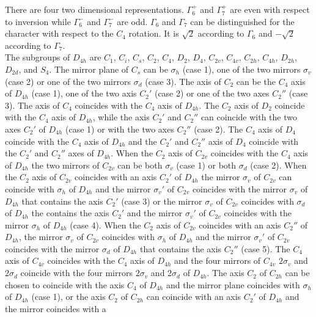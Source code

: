 \documentclass[12pt,a4paper,twoside]{report}
\begin{document}
There are four two dimensional representations. $\Gamma_6^+$ and $\Gamma_7^+$
are even with respect to inversion while $\Gamma_6^-$ and $\Gamma_7^-$ are 
odd. $\Gamma_6$ and $\Gamma_7$ can be distinguished for the character with
respect to the $C_4$ rotation. It is $\sqrt{2}$ according to $\Gamma_6$ and
$-\sqrt{2}$ according to $\Gamma_7$. \\
The subgroups of $D_{4h}$ are $C_1$, $C_i$, $C_s$, $C_2$, $C_4$, $D_2$, $D_4$,
$C_{2v}$, $C_{4v}$, $C_{2h}$, $C_{4h}$, $D_{2h}$, $D_{2d}$, and $S_4$. 
The mirror plane of $C_s$ can be $\sigma_h$ (case 1), one of the two mirrors 
$\sigma_v$ (case 2) or one of the two mirrors $\sigma_d$ (case 3). 
The axis of $C_2$ can be the $C_4$ axis of $D_{4h}$ (case 1), 
one of the two axis $C_2'$ (case 2) or one of the two axes $C_2''$ (case 3). 
The axis of $C_4$ coincides with the $C_4$ axis of $D_{4h}$. 
The $C_2$ axis of $D_2$ coincide with the $C_4$ axis of $D_{4h}$, while
the axis $C_2'$ and $C_2''$ can coincide with the two axes $C_2'$ of
$D_{4h}$ (case 1) or with the two axes $C_2''$ (case 2).
The $C_4$ axis of $D_4$ coincide with the $C_4$ axis of $D_{4h}$ and
the $C_2'$ and $C_2''$ axis of $D_4$ coincide with the $C_2'$ and $C_2''$ axes
of $D_{4h}$.
When the $C_2$ axis of $C_{2v}$ coincides with the $C_4$ axis
of $D_{4h}$ the two mirrors of $C_{2v}$ can be both $\sigma_v$ (case 1) or 
both $\sigma_d$ (case 2). When the $C_2$ axis of $C_{2v}$ coincides with an axis 
$C_2'$ of $D_{4h}$ the mirror $\sigma_v$ of $C_{2v}$ can coincide with $\sigma_h$ of
$D_{4h}$ and the mirror $\sigma_v'$ of $C_{2v}$ coincides with the mirror
$\sigma_v$ of $D_{4h}$ that contains the axis $C_2'$ (case 3) or the mirror
$\sigma_v$ of $C_{2v}$ coincides with $\sigma_d$ of
$D_{4h}$ the contains the axis $C_2'$ and the mirror $\sigma_v'$ of $C_{2v}$ 
coincides with the mirror $\sigma_h$ of $D_{4h}$ (case 4). 
When the $C_2$ axis of $C_{2v}$ coincides with an axis $C_2''$
of $D_{4h}$, the mirror $\sigma_v$ of $C_{2v}$ coincides with $\sigma_h$ 
of $D_{4h}$ and the mirror $\sigma_v'$ of $C_{2v}$ coincides with the
mirror $\sigma_d$ of $D_{4h}$ that contains the axis $C_2''$ (case 5). 
The $C_4$ axis of $C_{4v}$ coincides with the $C_4$ axis of $D_{4h}$
and the four mirrors of $C_{4v}$ $2\sigma_v$ and $2\sigma_d$
coincide with the four mirrors $2\sigma_v$ and $2\sigma_d$ of $D_{4h}$. 
The axis $C_2$ of $C_{2h}$ can be chosen to coincide with the 
axis $C_4$ of $D_{4h}$ and the mirror plane coincides with
$\sigma_h$ of $D_{4h}$ (case 1), or the axis $C_2$ of $C_{2h}$ can
coincide with an axis $C_2'$ of $D_{4h}$ and the mirror coincides with a 
\end{document}
